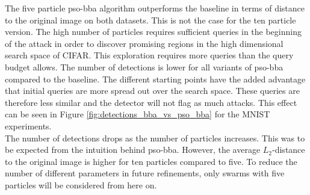 The five particle \gls{pso}-\gls{bba} algorithm outperforms the baseline in terms of distance to the original image on both datasets. This is not the case for the ten particle version. The high number of particles requires sufficient queries in the beginning of the attack in order to discover promising regions in the high dimensional search space of CIFAR. This exploration requires more queries than the query budget allows. The number of detections is lower for all variants of \gls{pso}-\gls{bba} compared to the baseline. The different starting points have the added advantage that initial queries are more spread out over the search space. These queries are therefore less similar and the detector will not flag as much attacks. This effect can be seen in Figure \ref{fig:detections_bba_vs_pso_bba} for the MNIST experiments.\\

The number of detections drops as the number of particles increases. This was to be expected from the intuition behind \gls{pso}-\gls{bba}. However, the average $L_2$-distance to the original image is higher for ten particles compared to five. To reduce the number of different parameters in future refinements, only swarms with five particles will be considered from here on.\\ 

